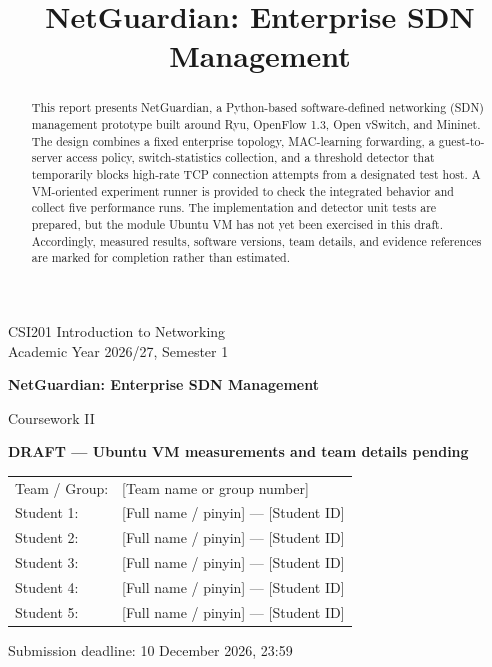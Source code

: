 \documentclass[conference]{IEEEtran}
\begin{document}
\onecolumn
{}
\begin{titlepage}
\centering
\vspace*{2cm}
{\Large CSI201 Introduction to Networking\\[0.3cm]
Academic Year 2026/27, Semester 1\par}
\vspace{1.8cm}
{\huge\bfseries NetGuardian: Enterprise SDN Management\par}
\vspace{0.5cm}
{\Large Coursework II\par}
\vspace{1.2cm}
{\Large\color{red}\bfseries DRAFT --- Ubuntu VM measurements and team details pending\par}
\vspace{1.5cm}
\begin{tabular}{ll}
Team / Group: & [Team name or group number] \\
Student 1: & [Full name / pinyin] --- [Student ID] \\
Student 2: & [Full name / pinyin] --- [Student ID] \\
Student 3: & [Full name / pinyin] --- [Student ID] \\
Student 4: & [Full name / pinyin] --- [Student ID] \\
Student 5: & [Full name / pinyin] --- [Student ID] \\
\end{tabular}
\vfill
Submission deadline: 10 December 2026, 23:59\par
\end{titlepage}
\clearpage
{}
\setcounter{page}{1}
\twocolumn

\title{NetGuardian: Enterprise SDN Management}
\author{
}
\maketitle

\begin{abstract}
This report presents NetGuardian, a Python-based software-defined networking (SDN) management prototype built around Ryu, OpenFlow 1.3, Open vSwitch, and Mininet. The design combines a fixed enterprise topology, MAC-learning forwarding, a guest-to-server access policy, switch-statistics collection, and a threshold detector that temporarily blocks high-rate TCP connection attempts from a designated test host. A VM-oriented experiment runner is provided to check the integrated behavior and collect five performance runs. The implementation and detector unit tests are prepared, but the module Ubuntu VM has not yet been exercised in this draft. Accordingly, measured results, software versions, team details, and evidence references are marked for completion rather than estimated.
\end{abstract}
\end{document}
